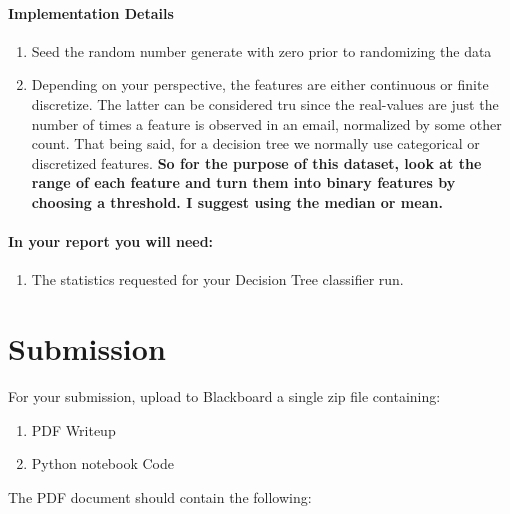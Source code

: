 \documentclass[12pt]{article}
\begin{document}
\paragraph{Implementation Details}
\begin{enumerate}
\item Seed the random number generate with zero prior to randomizing the data
\item Depending on your perspective, the features are either continuous or finite discretize.  The latter can be considered tru since the real-values are just the number of times a feature is observed in an email, normalized by some other count.  That being said, for a decision tree we normally use categorical or discretized features.  \textbf{So for the purpose of this dataset, look at the range of each feature and turn them into binary features by choosing a threshold.  I suggest using the median or mean.}  
\end{enumerate}
\paragraph{In your report you will need:}
\begin{enumerate}
\item The statistics requested for your Decision Tree classifier run.
\end{enumerate}


\newpage
\section*{Submission}
For your submission, upload to Blackboard a single zip file containing:

\begin{enumerate}
\item PDF Writeup
\item Python notebook Code
\end{enumerate}


\noindent
The PDF document should contain the following:
\end{document}

